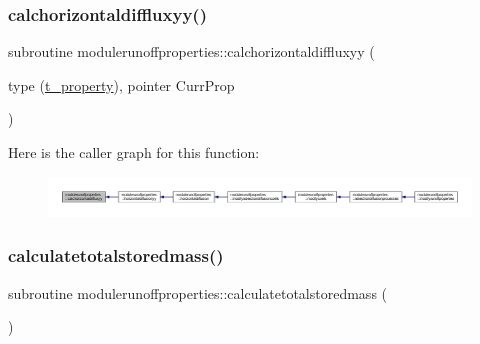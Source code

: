 \subsubsection{\texorpdfstring{calchorizontaldiffluxyy()}{calchorizontaldiffluxyy()}}
{\footnotesize\ttfamily subroutine modulerunoffproperties\+::calchorizontaldiffluxyy (\begin{DoxyParamCaption}\item[{type (\mbox{\hyperlink{structmodulerunoffproperties_1_1t__property}{t\+\_\+property}}), pointer}]{Curr\+Prop }\end{DoxyParamCaption})\hspace{0.3cm}{\ttfamily [private]}}

Here is the caller graph for this function\+:\nopagebreak
\begin{figure}[H]
\begin{center}
\leavevmode
\includegraphics[width=350pt]{namespacemodulerunoffproperties_af55b2182548c087b1f254c0a7fe61904_icgraph}
\end{center}
\end{figure}
\mbox{\label{namespacemodulerunoffproperties_a6cac2121fb78c6414c74fdfb38dafcb1}} 
\subsubsection{\texorpdfstring{calculatetotalstoredmass()}{calculatetotalstoredmass()}}
{\footnotesize\ttfamily subroutine modulerunoffproperties\+::calculatetotalstoredmass (\begin{DoxyParamCaption}{ }\end{DoxyParamCaption})\hspace{0.3cm}{\ttfamily [private]}}

